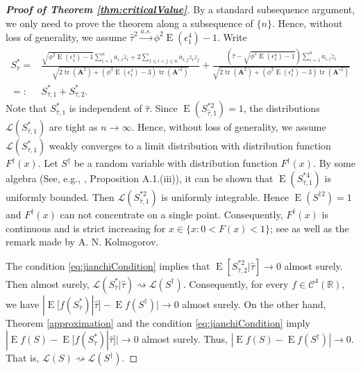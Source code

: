 \documentclass[11pt]{article}
\DeclareMathOperator{\mytr}{tr}
\DeclareMathOperator{\myE}{E}
\newcommand{\BA}{\mathbf{A}}    \newcommand{\BB}{\mathbf{B}}    \newcommand{\BC}{\mathbf{C}}    \newcommand{\BD}{\mathbf{D}}    \newcommand{\BE}{\mathbf{E}}    \newcommand{\BF}{\mathbf{F}}    \newcommand{\BG}{\mathbf{G}}    \newcommand{\BH}{\mathbf{H}}    \newcommand{\BI}{\mathbf{I}}    \newcommand{\BJ}{\mathbf{J}}    \newcommand{\BK}{\mathbf{K}}    \newcommand{\BL}{\mathbf{L}}
\theoremstyle{plain}
\theoremstyle{definition}
\theoremstyle{remark}
\begin{document}
\begin{proof}[\textbf{Proof of Theorem \ref{thm:criticalValue}}]
    By a standard subsequence argument, we only need to prove the theorem along a subsequence of $\{n\}$.
    Hence, without loss of generality, we assume $\hat \tau^2 \xrightarrow{a.s.} \phi^2 \myE (\epsilon_1^4)-1$.
    Write
    \begin{equation*}
        \begin{split}
        S_{\hat \tau}^* =&
        \frac{
            \sqrt{\phi^2\myE (\epsilon_1^4)-1} \sum_{i=1}^n  a_{i,i}\check z_i
        +2\sum_{1\leq i <j \leq n} a_{i,j} z_i z_j
    }
    {
            \sqrt{
    2 \mytr(\BA^2)
    +
    (\phi^2\myE (\epsilon_1^4)-3) \mytr(\BA^{\circ 2})
            }             
        }
        +
        \frac{
                (\hat \tau -
            \sqrt{
                \phi^2\myE (\epsilon_1^4)-1
            }
        )
             \sum_{i=1}^n  a_{i,i}\check z_i
    }
    {
            \sqrt{
    2 \mytr(\BA^2)
    +
    (\phi^2\myE (\epsilon_1^4)-3) \mytr(\BA^{\circ 2})
            }             
        }
        \\
        =:& S_{\hat \tau,1}^{*} + S_{\hat \tau,2}^{*}
    .
        \end{split}
    \end{equation*}
    Note that $S_{\hat{\tau},1}^*$ is independent of $\hat \tau$.
    Since $\myE ( S_{\hat \tau,1}^{*2} )=1$,  the distributions $\mathcal L(S_{\hat \tau,1}^{*}) $ are tight as $n\to \infty$.
    Hence, without loss of generality, we assume $\mathcal L (S_{\hat \tau,1}^*)$ weakly converges to a limit distribution with distribution function $F^\dagger(x)$.
    Let $S^\dagger$ be a random variable with distribution function $F^\dagger(x)$.
    By some algebra (See, e.g., \cite{chen2010tests}, Proposition A.1.(iii)),
    it can be shown that $\myE (S^{*4}_{\hat \tau,1})$ is uniformly bounded.
    Then $\mathcal L ( S_{\hat \tau,1}^{*2} )$ is  uniformly integrable.
    Hence $\myE(S^{\dagger 2})=1$ and $F^\dagger(x)$ can not concentrate on a single point.
    Consequently, $F^\dagger(x)$ is continuous and is strict increasing for $x\in\{x:0<F(x)<1\}$; see \cite{Sevast1961A} as well as the remark made by A. N. Kolmogorov.

    The condition \eqref{eq:jianchiCondition} implies that $\myE[S_{\hat \tau,2}^{*2}|\hat \tau]\to 0$ almost surely.
    Then almost surely, $\mathcal L (S^*_{\hat \tau}|\hat \tau) \rightsquigarrow \mathcal L(S^\dagger)$.
    Consequently, for every $f\in \mathscr C^4 (\mathbb R)$,
    we have $| \myE [f(S^*_{\hat \tau}) |\hat\tau] - \myE f(S^\dagger) |\to 0$ almost surely.
    On the other hand, Theorem \ref{approximation} and the condition \eqref{eq:jianchiCondition} imply
        $|\myE f(S)- \myE [f(S^*_{\hat \tau})|\hat\tau] |\to 0$ almost surely.
        Thus, $|\myE f(S)- \myE f(S^\dagger) |\to 0$.
        That is, $\mathcal L (S)\rightsquigarrow \mathcal L (S^\dagger)$.


\end{proof}
\end{document}
